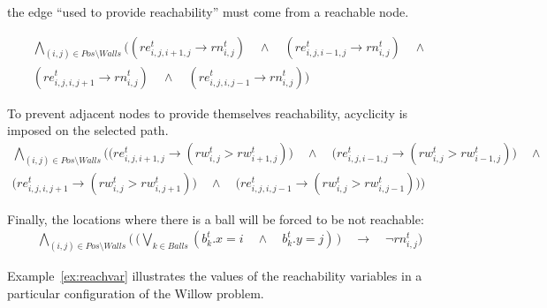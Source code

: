\documentclass{report}
\theoremstyle{plain}
\begin{document}
the edge ``used to provide reachability'' must come from a reachable node.

\begin{multline*}
\bigwedge \limits_{(i, j) \in Pos \setminus Walls} \big( (re_{i, j, i + 1, j}^t \rightarrow rn_{i,j}^t) \quad \wedge \quad (re_{i, j, i - 1, j}^t \rightarrow rn_{i,j}^t) \quad \wedge \\
(re_{i, j, i, j + 1}^t \rightarrow rn_{i,j}^t) \quad \wedge \quad (re_{i, j, i, j - 1}^t \rightarrow rn_{i,j}^t) \big)
\end{multline*}

To prevent adjacent nodes to provide themselves reachability, acyclicity is imposed on the selected path.
\begin{multline*}
\bigwedge \limits_{(i, j) \in Pos \setminus Walls} \Big( \big( re_{i, j, i + 1, j}^t \rightarrow (rw_{i, j}^t > rw_{i + 1, j}^t) \big) \quad \wedge \quad \big( re_{i, j, i - 1, j}^t \rightarrow (rw_{i, j}^t > rw_{i - 1, j}^t) \big) \quad \wedge \\
\big( re_{i, j, i, j + 1}^t \rightarrow (rw_{i, j}^t > rw_{i, j + 1}^t) \big) \quad \wedge \quad \big( re_{i, j, i, j - 1}^t \rightarrow (rw_{i, j}^t > rw_{i, j - 1}^t) \big) \Big)
\end{multline*}

Finally, the locations where there is a ball will be forced to be not reachable:
\begin{align*}
\bigwedge \limits_{(i, j) \in Pos \setminus Walls} \Big(\, \big( \bigvee \limits_{k\in Balls} (b_k^t.x = i \quad \wedge \quad b_k^t.y = j)\,\big) \quad \rightarrow \quad \lnot  rn_{i,j}^t \Big)
\end{align*}

Example~\ref{ex:reachvar} illustrates the values of the reachability variables in a particular configuration of the Willow problem.

\vspace{1\baselineskip}
\end{document}
